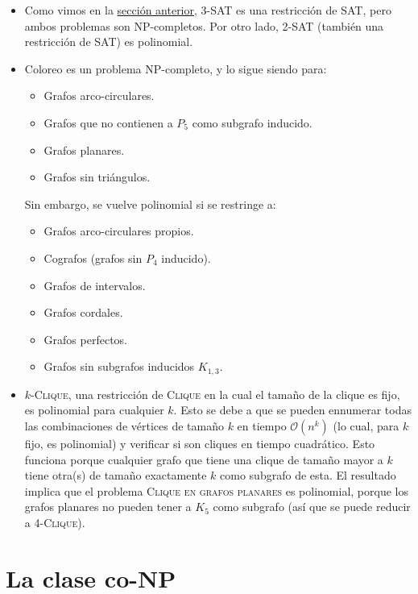 \documentclass[a4paper]{report}
\newcommand{\BigO}[1]{\ensuremath{\mathcal{O}(#1)}}
\begin{document}
\begin{itemize}
    \item Como vimos en la \hyperref[3-sat]{sección anterior}, 3-SAT es una restricción de SAT, pero ambos problemas son NP-completos. Por otro lado, 2-SAT (también una restricción de SAT) es polinomial.
    \item Coloreo es un problema NP-completo, y lo sigue siendo para:
          \begin{itemize}
              \item Grafos arco-circulares.
              \item Grafos que no contienen a $P_5$ como subgrafo inducido.
              \item Grafos planares.
              \item Grafos sin triángulos.
          \end{itemize}

          Sin embargo, se vuelve polinomial si se restringe a:
          \begin{itemize}
              \item Grafos arco-circulares propios.
              \item Cografos (grafos sin $P_4$ inducido).
              \item Grafos de intervalos.
              \item Grafos cordales.
              \item Grafos perfectos.
              \item Grafos sin subgrafos inducidos $K_{1, 3}$.
          \end{itemize}

    \item $k$-\textsc{Clique}, una restricción de \textsc{Clique} en la cual el tamaño de la clique es fijo, es polinomial para cualquier $k$. Esto se debe a que se pueden ennumerar todas las combinaciones de vértices de tamaño $k$ en tiempo \BigO{n^k} (lo cual, para $k$ fijo, es polinomial) y verificar si son cliques en tiempo cuadrático. Esto funciona porque cualquier grafo que tiene una clique de tamaño mayor a $k$ tiene otra(s) de tamaño exactamente $k$ como subgrafo de esta. El resultado implica que el problema \textsc{Clique en grafos planares} es polinomial, porque los grafos planares no pueden tener a $K_5$ como subgrafo (así que se puede reducir a \textsc{4-Clique}).
\end{itemize}

\section{La clase co-NP}
\end{document}
